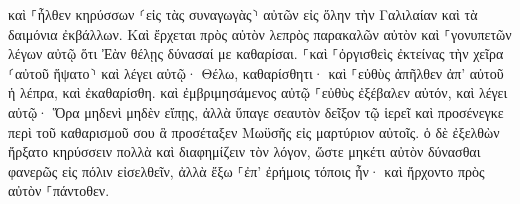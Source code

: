 \documentclass{openreader}
\begin{document}
καὶ ⸀ἦλθεν κηρύσσων ⸂εἰς τὰς συναγωγὰς⸃ αὐτῶν εἰς ὅλην τὴν Γαλιλαίαν καὶ τὰ δαιμόνια ἐκβάλλων. 
Καὶ ἔρχεται πρὸς αὐτὸν λεπρὸς παρακαλῶν αὐτὸν καὶ ⸀γονυπετῶν λέγων αὐτῷ ὅτι Ἐὰν θέλῃς δύνασαί με καθαρίσαι. 
⸀καὶ ⸀ὀργισθεὶς ἐκτείνας τὴν χεῖρα ⸂αὐτοῦ ἥψατο⸃ καὶ λέγει αὐτῷ· Θέλω, καθαρίσθητι· 
καὶ ⸀εὐθὺς ἀπῆλθεν ἀπ’ αὐτοῦ ἡ λέπρα, καὶ ἐκαθαρίσθη. 
καὶ ἐμβριμησάμενος αὐτῷ ⸀εὐθὺς ἐξέβαλεν αὐτόν, 
καὶ λέγει αὐτῷ· Ὅρα μηδενὶ μηδὲν εἴπῃς, ἀλλὰ ὕπαγε σεαυτὸν δεῖξον τῷ ἱερεῖ καὶ προσένεγκε περὶ τοῦ καθαρισμοῦ σου ἃ προσέταξεν Μωϋσῆς εἰς μαρτύριον αὐτοῖς. 
ὁ δὲ ἐξελθὼν ἤρξατο κηρύσσειν πολλὰ καὶ διαφημίζειν τὸν λόγον, ὥστε μηκέτι αὐτὸν δύνασθαι φανερῶς εἰς πόλιν εἰσελθεῖν, ἀλλὰ ἔξω ⸀ἐπ’ ἐρήμοις τόποις ἦν· καὶ ἤρχοντο πρὸς αὐτὸν ⸀πάντοθεν. 
\end{document}
